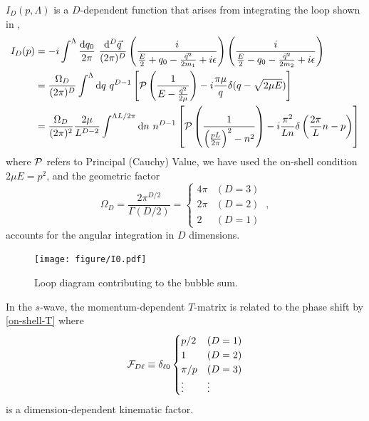 $I_D(p,\Lambda)$ is a $D$-dependent function that arises from integrating the loop shown in ,
\begin{align}
    I_D(p)
    &=-i\int^{\Lambda}
        \frac { \mathrm {d}q_0}{2\pi}\ \frac{\mathrm { d } ^ { D } \vec{ q } } { (2\pi)^ { D } }
        \left( \frac { i } { \frac{E}{2} + q _ { 0 } - \frac{\vec{q}^2}{2m_1} + i \epsilon } \right)
        \left( \frac { i } { \frac{E}{2} - q _ { 0 } - \frac{\vec{q}^2}{2m_2} + i \epsilon } \right)
    \label{eq:I0 in two particle language}\\
    &=\frac{\Omega_D}{(2\pi)^D}\int^{\Lambda}  \mathrm { d } q \ q^{D-1}\left[\PV \left( \frac { 1 } { E - \frac{\vec{q}^2}{2\mu} } \right)
-i\frac{\pi \mu}{q}\delta(q-\sqrt{2 \mu E})\right]
    \label{eq:I0 in relative coordinates}
    \\
    &=\frac{\Omega_D}{(2\pi)^2}\frac{2\mu}{L^{D-2}}\int^{\Lambda L/2\pi}  \mathrm { d } n \ n^{D-1}\left[\PV \left( \frac { 1 } { \left(\frac{pL}{2\pi}\right)^2 - n^2 } \right)
-i\frac{\pi^2}{L n}\delta\left(\frac{2\pi}{L}n -p\right)\right]
    \label{eq:I0}
\end{align}
where $\mathcal{P}$ refers to Principal (Cauchy) Value, we have used the on-shell condition $2\mu E=p^2$, and the geometric factor
\begin{equation}
\Omega_D=\frac{2\pi^{D/2}}{\Gamma(D/2)}=
    \begin{cases}
        4\pi    &   (D=3)\\
        2\pi    &   (D=2)\\
        2       &   (D=1)
    \end{cases}\ ,
\end{equation}
accounts for the angular integration in $D$ dimensions.

\begin{figure}[h!]
    \center
    \texttt{[image: figure/I0.pdf]}
    \caption{
        Loop diagram contributing to the bubble sum.
    }
    \label{fig:I0}
\end{figure}

In the $s$-wave, the momentum-dependent $T$-matrix is related to the phase shift by \eqref{on-shell-T} where
\begin{equation}\label{eq:spherical FD}
    \mathcal{F}_{D\ell} 
    \equiv
    \delta_{\ell 0}
    \begin{cases}
        p/2     & (D=1)\\
        1       & (D=2)\\
        \pi/p   & (D=3)\\
        \vdots  & \vdots
\end{cases}
\end{equation}
is a dimension-dependent kinematic factor.

